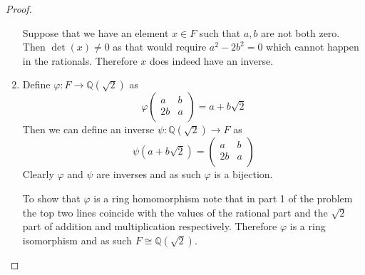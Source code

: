 \documentclass[10pt]{article}
\newcommand{\sk}{\vskip 10mm}
\newcommand{\bb}[1]{\mathbb{#1}}
\theoremstyle{plain}
\theoremstyle{remark}
\begin{document}
\begin{proof}
\begin{enumerate}
    Suppose that we have an element $x\in F$ such that $a,b$ are not both zero.
    Then $\det(x)\neq 0$ as that would require $a^2-2b^2=0$ which cannot happen
    in the rationals. Therefore $x$ does indeed have an inverse.
  \item Define $\varphi:F\rightarrow\bb{Q}(\sqrt{2})$ as
    \[ \varphi
      \left(
        \begin{array}{cc}
          a&b\\
          2b&a\\

        \end{array}
      \right)=a+b\sqrt{2}\]
    Then we can define an inverse $\psi:\bb{Q}(\sqrt{2})\rightarrow F$ as
    \[ \psi(a+b\sqrt{2})=
      \left(
        \begin{array}{cc}
          a&b\\
          2b&a\\
        \end{array}
      \right)\]
    Clearly $\varphi$ and $\psi$ are inverses and as such $\varphi$ is a bijection.

    To show that $\varphi$ is a ring homomorphism note that in part 1 of the
    problem the top two lines coincide with the values of the rational
    part and the $\sqrt{2}$ part of addition and multiplication respectively.
    Therefore $\varphi$ is a ring isomorphism and as such $F\cong \bb{Q}(\sqrt{2})$.
  \end{enumerate}
\end{proof}

\sk

\end{document}

